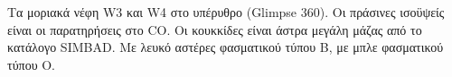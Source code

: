 Τα μοριακά νέφη W3 και W4 στο υπέρυθρο (Glimpse 360). Οι πράσινες ισοϋψείς είναι οι παρατηρήσεις στο CO. Οι κουκκίδες είναι άστρα μεγάλη μάζας από το κατάλογο SIMBAD. Με λευκό αστέρες φασματικού τύπου B, με μπλε φασματικού τύπου O.